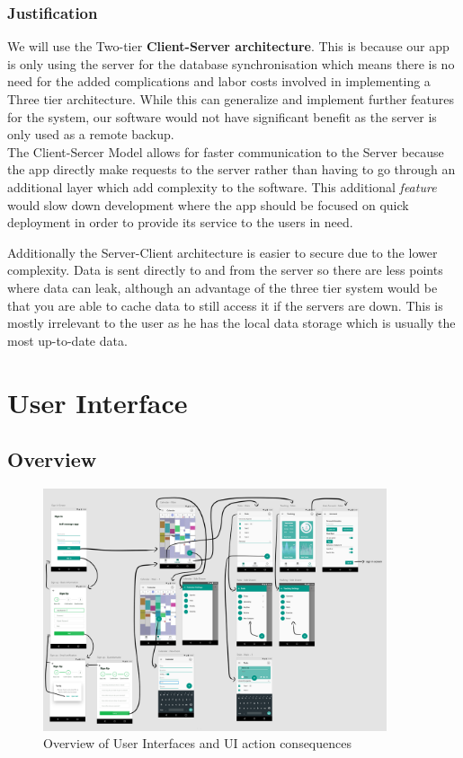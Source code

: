 \documentclass[a4paper,11pt]{article} %
\begin{document}
\subsubsection{Justification}
We will use the Two-tier \textbf{Client-Server architecture}. This is because our app is only using
the server for the database synchronisation which means there is no need for the added complications
and labor costs involved in implementing a Three tier architecture. While this can generalize and implement further
features for the system, our software would not have significant benefit as the server is only used as a remote backup.
\\
The Client-Sercer Model allows 
for faster communication to the Server because the app directly make requests to the server rather than having to go through an additional layer which
add complexity to the software. This additional \emph{feature} would slow down development where the app should be focused on quick deployment in order
to provide its service to the users in need.

Additionally the Server-Client architecture is easier to secure due to the lower complexity. Data is sent directly to and from the server so there are less 
points where data can leak, although an advantage of the three tier system would be that you are able to cache data to still access it if the servers are down.
This is mostly irrelevant to the user as he has the local data storage which is usually the most up-to-date data.
\newpage

\section{User Interface}

\subsection{Overview}
\begin{figure}[h!]
  \centering
  \includegraphics[angle=-90, width=0.9\textwidth]{img/ui-wireframe/Wireframe-connections.jpg}
  \caption{Overview of User Interfaces and UI action consequences}
\end{figure}
\newpage
\end{document}
